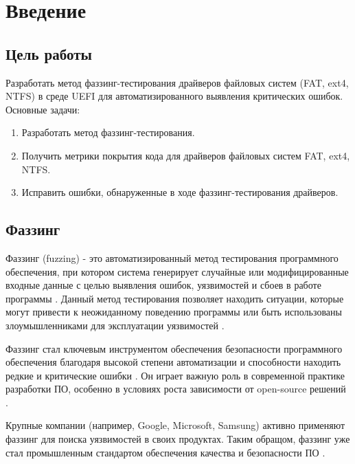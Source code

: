 \section{Введение}
\subsection{Цель работы}
Разработать метод фаззинг-тестирования драйверов файловых систем (FAT, ext4, NTFS) в среде UEFI для автоматизированного выявления критических ошибок. Основные задачи:
\begin{enumerate}
	\item Разработать метод фаззинг-тестирования.
	\item Получить метрики покрытия кода для драйверов файловых систем FAT, ext4, NTFS.
	\item Исправить ошибки, обнаруженные в ходе фаззинг-тестирования драйверов.
\end{enumerate}
\subsection{Фаззинг}
Фаззинг (fuzzing) - это автоматизированный метод тестирования программного обеспечения, при котором система генерирует случайные или модифицированные входные данные с целью выявления ошибок, уязвимостей и сбоев в работе программы \cite{Kuliamin}. Данный метод тестирования позволяет находить ситуации, которые могут привести к неожиданному поведению программы или быть использованы злоумышленниками для эксплуатации уязвимостей \cite{Manes}.

Фаззинг стал ключевым инструментом обеспечения безопасности программного обеспечения благодаря высокой степени автоматизации и способности находить редкие и критические ошибки \cite{Manes}. Он играет важную роль в современной практике разработки ПО, особенно в условиях роста зависимости от open-source решений \cite{Boehme}.

Крупные компании (например, Google, Microsoft, Samsung) активно применяют фаззинг для поиска уязвимостей в своих продуктах. Таким обращом, фаззинг уже стал промышленным стандартом обеспечения качества и безопасности ПО \cite{Boehme}.

